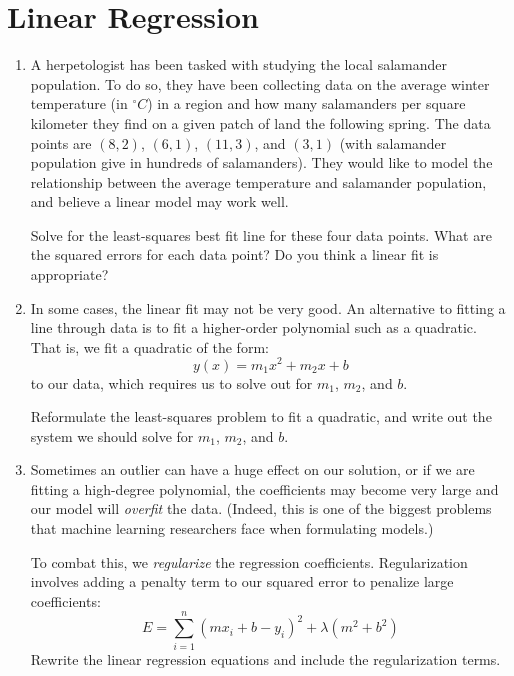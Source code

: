 \documentclass[letterpaper, 11pt]{article}
\begin{document}
\section{Linear Regression}
\begin{enumerate}
\item A herpetologist has been tasked with studying the local salamander population. To do so, they have been collecting data on the average winter temperature (in $^\circ C$) in a region and how many salamanders per square kilometer they find on a given patch of land the following spring. The data points are $(8, 2)$, $(6, 1)$, $(11, 3)$, and $(3, 1)$ (with salamander population give in hundreds of salamanders). They would like to model the relationship between the average temperature and salamander population, and believe a linear model may work well. 

\par Solve for the least-squares best fit line for these four data points. What are the squared errors for each data point? Do you think a linear fit is appropriate? 

\item In some cases, the linear fit may not be very good. An alternative to fitting a line through data is to fit a higher-order polynomial such as a quadratic. That is, we fit a quadratic of the form:
\[ y(x) = m_1 x^2 + m_2 x + b\]
to our data, which requires us to solve out for $m_1$, $m_2$, and $b$. 
\par Reformulate the least-squares problem to fit a quadratic, and write out the system we should solve for $m_1$, $m_2$, and $b$.

\item Sometimes an outlier can have a huge effect on our solution, or if we are fitting a high-degree polynomial, the coefficients may become very large and our model will \textit{overfit} the data. (Indeed, this is one of the biggest problems that machine learning researchers face when formulating models.) 
\par To combat this, we \textit{regularize} the regression coefficients. Regularization involves adding a penalty term to our squared error to penalize large coefficients:
\[ E = \sum_{i=1}^n(mx_i + b - y_i)^2 + \lambda(m^2 + b^2) \]
Rewrite the linear regression equations and include the regularization terms. 

\end{enumerate}
\end{document}
